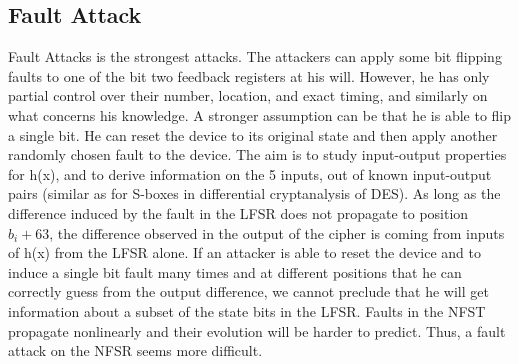 \subsection{Fault Attack}
Fault Attacks is the strongest attacks. The attackers can apply some bit flipping faults to one of the bit two feedback registers at his will. However, he has only partial control over their number, location, and exact timing, and similarly on what concerns his knowledge. A stronger assumption can be that he is able to flip a single bit. He can reset the device to its original state and then apply another randomly chosen fault to the device. The aim is to study input-output properties for h(x), and to derive information on the 5 inputs, out
of known input-output pairs (similar as for S-boxes in differential cryptanalysis of DES). As long as the difference induced by the fault in the LFSR does not propagate to position $b_i+63$, the difference observed in the output of the cipher is coming from inputs of h(x) from the LFSR alone. If an attacker is able to reset
the device and to induce a single bit fault many times and at different positions that he can correctly guess from the output difference, we cannot preclude that he will get information about a subset of the state bits in the LFSR. Faults in the NFST propagate nonlinearly and their evolution will be harder to predict. Thus, a fault attack on the NFSR seems more difficult.